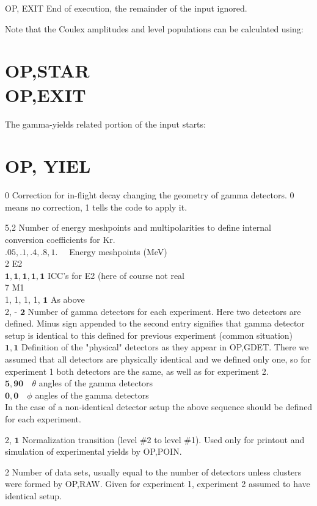 \documentclass[10pt]{article}
\begin{document}
OP, EXIT End of execution, the remainder of the input ignored.

Note that the Coulex amplitudes and level populations can be calculated using:

\section*{OP,STAR \\
 OP,EXIT}
The gamma-yields related portion of the input starts:

\section*{OP, YIEL}
0 Correction for in-flight decay changing the geometry of gamma detectors. 0 means no correction, 1 tells the code to apply it.

5,2 Number of energy meshpoints and multipolarities to define internal conversion coefficients for Kr.\\
$.05, .1, .4, .8,1 . \quad$ Energy meshpoints (MeV)\\
2 E2\\
$\mathbf{1}, \mathbf{1}, \mathbf{1}, \mathbf{1}, \mathbf{1}$ ICC's for E2 (here of course not real\\
7 M1\\
1, 1, 1, 1, $\mathbf{1}$ As above\\
2, - $\mathbf{2}$ Number of gamma detectors for each experiment. Here two detectors are defined. Minus sign appended to the second entry signifies that gamma detector setup is identical to this defined for previous experiment (common situation)\\
$\mathbf{1 , 1}$ Definition of the "physical" detectors as they appear in OP,GDET. There we assumed that all detectors are physically identical and we defined only one, so for experiment 1 both detectors are the same, as well as for experiment 2.\\
$\mathbf{5}, \mathbf{9 0} \quad \theta$ angles of the gamma detectors\\
$\mathbf{0}, \mathbf{0} \quad \phi$ angles of the gamma detectors\\
In the case of a non-identical detector setup the above sequence should be defined for each experiment.

2, $\mathbf{1}$ Normalization transition (level \#2 to level \#1). Used only for printout and simulation of experimental yields by OP,POIN.

2 Number of data sets, usually equal to the number of detectors unless clusters were formed by OP,RAW. Given for experiment 1, experiment 2 assumed to have identical setup.
\end{document}
